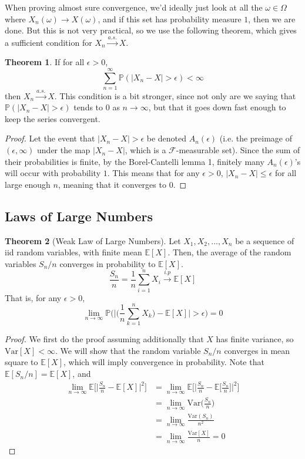 \documentclass{article}
\theoremstyle{definition}
\newtheorem{theorem}{Theorem}[section]
\theoremstyle{remark}
\theoremstyle{definition}
\begin{document}
When proving almost sure convergence, we'd ideally just look at all the $\omega \in \Omega$ where $X_n (\omega) \rightarrow X(\omega)$, and if this set has probability measure $1$, then we are done. But this is not very practical, so we use the following theorem, which gives a sufficient condition for $X_n \xrightarrow{a.s.} X$. 

\begin{theorem}
If for all $\epsilon > 0$, 
\[\sum_{n=1}^\infty \mathbb{P}(|X_n - X| > \epsilon ) < \infty\]
then $X_n \xrightarrow{a.s.} X$. This condition is a bit stronger, since not only are we saying that $\mathbb{P}(|X_n - X| > \epsilon)$ tends to $0$ as $n \rightarrow \infty$, but that it goes down fast enough to keep the series convergent. 
\end{theorem}
\begin{proof}
Let the event that $|X_n - X| > \epsilon$ be denoted $A_n (\epsilon)$ (i.e. the preimage of $(\epsilon, \infty)$ under the map $|X_n - X|$, which is a $\mathcal{F}$-measurable set). Since the sum of their probabilities is finite, by the Borel-Cantelli lemma 1, finitely many $A_n(\epsilon)$'s will occur with probability $1$. This means that for any $\epsilon > 0$, $|X_n - X| \leq \epsilon$ for all large enough $n$, meaning that it converges to $0$. 
\end{proof}

\subsection{Laws of Large Numbers}

\begin{theorem}[Weak Law of Large Numbers]
Let $X_1, X_2, ..., X_n$ be a sequence of iid random variables, with finite mean $\mathbb{E}[X]$. Then, the average of the random variables $S_n / n$ converges in probability to $\mathbb{E}[X]$. 
\[\frac{S_n}{n} = \frac{1}{n} \sum_{i=1}^n X_i \xrightarrow{i.p} \mathbb{E}[X]\]
That is, for any $\epsilon > 0$, 
\[\lim_{n \rightarrow \infty} \mathbb{P} \bigg( \bigg| \Big( \frac{1}{n} \sum_{k=1}^n X_k \Big) - \mathbb{E}[X] \bigg| > \epsilon \bigg) = 0\]
\end{theorem}
\begin{proof}
We first do the proof assuming additionally that $X$ has finite variance, so $\mathrm{Var}[X] < \infty$. We will show that the random variable $S_n/n$ converges in mean square to $\mathbb{E}[X]$, which will imply convergence in probability. Note that $\mathbb{E}[S_n / n] = \mathbb{E}[X]$, and 
\begin{align*}
    \lim_{n \rightarrow \infty} \mathbb{E} \bigg[ \bigg| \frac{S_n}{n} - \mathbb{E}[X] \bigg|^2 \bigg] & = \lim_{n \rightarrow \infty} \mathbb{E} \bigg[ \bigg| \frac{S_n}{n} - \mathbb{E}\Big[\frac{S_n}{n}\Big] \bigg|^2 \bigg] \\
    & = \lim_{n \rightarrow \infty} \mathrm{Var}\Big( \frac{S_n}{n} \Big) \\
    & = \lim_{n \rightarrow \infty} \frac{\mathrm{Var}(S_n)}{n^2} \\
    & = \lim_{n \rightarrow \infty} \frac{\mathrm{Var}[X]}{n} = 0
\end{align*}
\end{proof}
\end{document}
